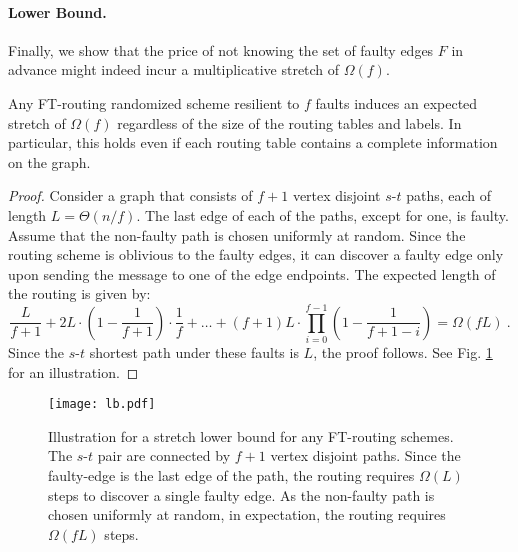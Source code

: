 \paragraph{Lower Bound.} Finally, we show that the price of not knowing the set of faulty edges $F$ in advance might indeed incur a multiplicative stretch of $\Omega(f)$. 

\begin{theorem}\label{thm:lb-routing}
Any FT-routing randomized scheme resilient to $f$ faults induces an expected stretch of $\Omega(f)$ regardless of the size of the routing tables and labels. In particular, this holds even if each routing table contains a complete information on the graph. 
\end{theorem}
\begin{proof}
Consider a graph that consists of $f+1$ vertex disjoint $s$-$t$ paths, each of length $L=\Theta(n/f)$. The last edge of each of the paths, except for one, is faulty. Assume that the non-faulty path is chosen uniformly at random. Since the routing scheme is oblivious to the faulty edges, it can discover a faulty edge only upon sending the message to one of the edge endpoints. The expected length of the routing is given by:
$$\frac{L}{f+1} +2L \cdot \left(1-\frac{1}{f+1} \right)\cdot \frac{1}{f} + \ldots+ \left(f+1\right)L\cdot \prod_{i=0}^{f-1} \left(1-\frac{1}{f+1-i}\right)=\Omega(f L)~.$$ 
Since the $s$-$t$ shortest path under these faults is $L$, the proof follows. See Fig. \ref{fig:LB-stretch} for an illustration.
\end{proof}


\begin{figure}[h!]
\begin{center}
\texttt{[image: lb.pdf]}
\caption{\sf Illustration for a stretch lower bound for any FT-routing schemes. The $s$-$t$ pair are connected by $f+1$ vertex disjoint paths. Since the faulty-edge is the last edge of the path, the routing requires $\Omega(L)$ steps to discover a single faulty edge. As the non-faulty path is chosen uniformly at random, in expectation, the routing requires $\Omega(fL)$ steps.  \label{fig:LB-stretch}
}
\end{center}
\end{figure}

